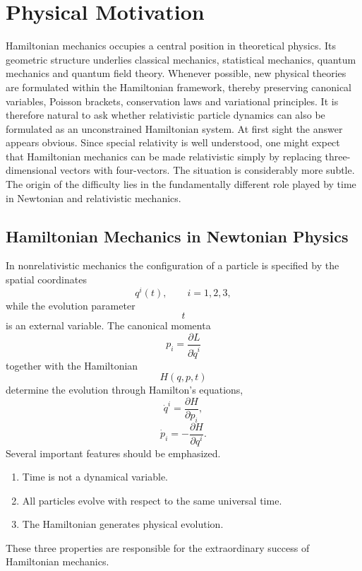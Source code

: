 \section{Physical Motivation}
Hamiltonian mechanics occupies a central position in theoretical
physics. Its geometric structure underlies classical mechanics,
statistical mechanics, quantum mechanics and quantum field theory.
Whenever possible, new physical theories are formulated within the
Hamiltonian framework, thereby preserving canonical variables, Poisson
brackets, conservation laws and variational principles.
It is therefore natural to ask whether relativistic particle dynamics
can also be formulated as an unconstrained Hamiltonian system.
At first sight the answer appears obvious. Since special relativity is
well understood, one might expect that Hamiltonian mechanics can be made
relativistic simply by replacing three-dimensional vectors with
four-vectors.
The situation is considerably more subtle.
The origin of the difficulty lies in the fundamentally different role
played by time in Newtonian and relativistic mechanics.
\subsection{Hamiltonian Mechanics in Newtonian Physics}
In nonrelativistic mechanics the configuration of a particle is
specified by the spatial coordinates
\[q^i(t),\qquad i=1,2,3,\]
while the evolution parameter
\[t\]
is an external variable.
The canonical momenta
\[p_i=\frac{\partial L}{\partial \dot q^i}\]
together with the Hamiltonian
\[H(q,p,t)\]
determine the evolution through Hamilton's equations,
\[\dot q^i=\frac{\partial H}{\partial p_i},\]
\[\dot p_i=-\frac{\partial H}{\partial q^i}.\]
Several important features should be emphasized.
\begin{enumerate}
   \item
    Time is not a dynamical variable.
   \item
    All particles evolve with respect to the same universal time.
   \item
    The Hamiltonian generates physical evolution.
\end{enumerate}
These three properties are responsible for the extraordinary success of
Hamiltonian mechanics.
